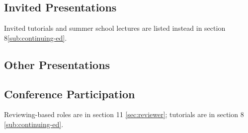 \documentclass[10pt]{article}
\begin{document}
%

\subsection{Invited Presentations} %

Invited tutorials and summer school lectures are listed instead in section 8\ref{sub:continuing-ed}.
{\color{white} \international\national\local\virtual\paid}

\begin{itemize}[leftmargin=5em]

\end{itemize}


\subsection{Other Presentations}

\begin{itemize}[leftmargin=5em]

\end{itemize}


%

\subsection{Conference Participation} %
\label{sec:conference-participation}

Reviewing-based roles are in section 11 \ref{sec:reviewer}; tutorials are in section 8 \ref{sub:continuing-ed}.
\end{document}
